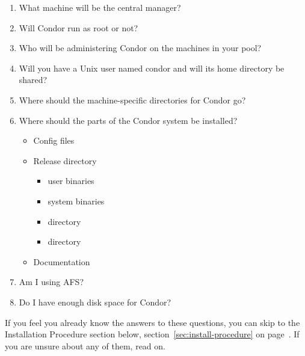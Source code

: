 \begin{enumerate}
\item What machine will be the central manager?
\item Will Condor run as root or not?
\item Who will be administering Condor on the machines in your pool?
\item Will you have a Unix user named condor and will its home directory be
   shared? 
\item Where should the machine-specific directories for Condor go?
\item Where should the parts of the Condor system be installed? 
	\begin{itemize}
	\item Config files
	\item Release directory
		\begin{itemize}
		\item user binaries
		\item system binaries 
		\item {} directory
	  	\item {} directory
		\end{itemize}
	\item Documentation
	\end{itemize}
\item Am I using AFS?
\item Do I have enough disk space for Condor?
\end{enumerate}

If you feel you already know the answers to these questions, you can
skip to the Installation Procedure section below,
section~\ref{sec:install-procedure} on
page~\pageref{sec:install-procedure}.
If you are unsure about any of them, read on.

